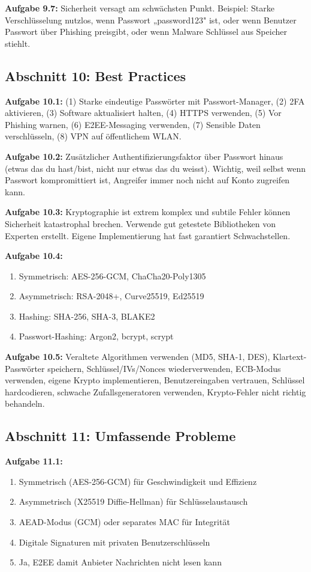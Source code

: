 \documentclass[11pt,a4paper]{report}
\begin{document}
\textbf{Aufgabe 9.7:}
Sicherheit versagt am schwächsten Punkt. Beispiel: Starke Verschlüsselung nutzlos, wenn Passwort „password123" ist, oder wenn Benutzer Passwort über Phishing preisgibt, oder wenn Malware Schlüssel aus Speicher stiehlt.

\subsection*{Abschnitt 10: Best Practices}

\textbf{Aufgabe 10.1:}
(1) Starke eindeutige Passwörter mit Passwort-Manager, (2) 2FA aktivieren, (3) Software aktualisiert halten, (4) HTTPS verwenden, (5) Vor Phishing warnen, (6) E2EE-Messaging verwenden, (7) Sensible Daten verschlüsseln, (8) VPN auf öffentlichem WLAN.

\textbf{Aufgabe 10.2:}
Zusätzlicher Authentifizierungsfaktor über Passwort hinaus (etwas das du hast/bist, nicht nur etwas das du weisst). Wichtig, weil selbst wenn Passwort kompromittiert ist, Angreifer immer noch nicht auf Konto zugreifen kann.

\textbf{Aufgabe 10.3:}
Kryptographie ist extrem komplex und subtile Fehler können Sicherheit katastrophal brechen. Verwende gut getestete Bibliotheken von Experten erstellt. Eigene Implementierung hat fast garantiert Schwachstellen.

\textbf{Aufgabe 10.4:}
\begin{enumerate}[label=\alph*)]
    \item Symmetrisch: AES-256-GCM, ChaCha20-Poly1305
    \item Asymmetrisch: RSA-2048+, Curve25519, Ed25519
    \item Hashing: SHA-256, SHA-3, BLAKE2
    \item Passwort-Hashing: Argon2, bcrypt, scrypt
\end{enumerate}

\textbf{Aufgabe 10.5:}
Veraltete Algorithmen verwenden (MD5, SHA-1, DES), Klartext-Passwörter speichern, Schlüssel/IVs/Nonces wiederverwenden, ECB-Modus verwenden, eigene Krypto implementieren, Benutzereingaben vertrauen, Schlüssel hardcodieren, schwache Zufallsgeneratoren verwenden, Krypto-Fehler nicht richtig behandeln.

\subsection*{Abschnitt 11: Umfassende Probleme}

\textbf{Aufgabe 11.1:}
\begin{enumerate}[label=\alph*)]
    \item Symmetrisch (AES-256-GCM) für Geschwindigkeit und Effizienz
    \item Asymmetrisch (X25519 Diffie-Hellman) für Schlüsselaustausch
    \item AEAD-Modus (GCM) oder separates MAC für Integrität
    \item Digitale Signaturen mit privaten Benutzerschlüsseln
    \item Ja, E2EE damit Anbieter Nachrichten nicht lesen kann
\end{enumerate}
\end{document}
